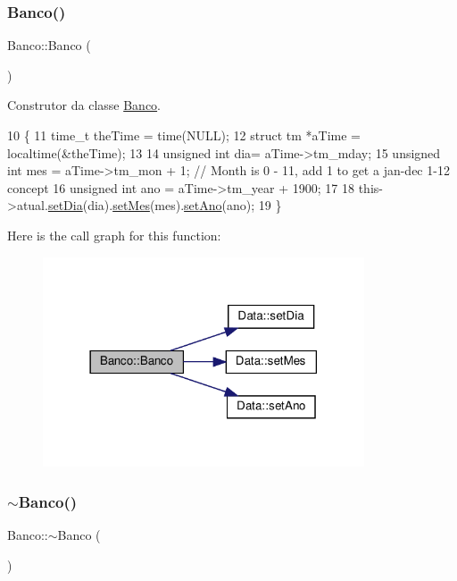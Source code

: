 \subsubsection{\texorpdfstring{Banco()}{Banco()}}
{\footnotesize\ttfamily Banco\+::\+Banco (\begin{DoxyParamCaption}{ }\end{DoxyParamCaption})}



Construtor da classe \hyperlink{classBanco}{Banco}. 


\begin{DoxyCode}
10              \{
11     time\_t theTime = time(NULL);
12     \textcolor{keyword}{struct }tm *aTime = localtime(&theTime);
13 
14     \textcolor{keywordtype}{unsigned} \textcolor{keywordtype}{int} dia= aTime->tm\_mday;
15     \textcolor{keywordtype}{unsigned} \textcolor{keywordtype}{int} mes = aTime->tm\_mon + 1; \textcolor{comment}{// Month is 0 - 11, add 1 to get a jan-dec 1-12 concept}
16     \textcolor{keywordtype}{unsigned} \textcolor{keywordtype}{int} ano = aTime->tm\_year + 1900;
17 
18     this->atual.\hyperlink{classData_a3e2c5356bc8d548b75c7d085f7a7c4ee}{setDia}(dia).\hyperlink{classData_ab15051ae481d89d057b22abc8152584c}{setMes}(mes).\hyperlink{classData_a8d4cfad647b590df436d8260000a2745}{setAno}(ano);
19 \}
\end{DoxyCode}
Here is the call graph for this function\+:
\nopagebreak
\begin{figure}[H]
\begin{center}
\leavevmode
\includegraphics[width=270pt]{classBanco_a686e51b219dc175e432e91559298b259_cgraph}
\end{center}
\end{figure}
\mbox{\label{classBanco_af69f9b0da3521d7c1e422f21dfd5829e}} 
\subsubsection{\texorpdfstring{$\sim$\+Banco()}{~Banco()}}
{\footnotesize\ttfamily Banco\+::$\sim$\+Banco (\begin{DoxyParamCaption}{ }\end{DoxyParamCaption})}



